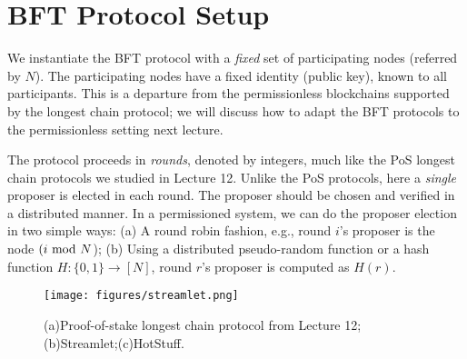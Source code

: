 \documentclass{article}
\newcommand{\pramod}[1]{{\color{red}
\footnotesize[Pramod: #1] }}
\begin{document}
\section*{BFT Protocol Setup}
We instantiate the  BFT protocol with a {\em fixed} set of participating nodes (referred by $N$). The participating nodes have a fixed identity (public key), known to all participants. This is a departure from the  permissionless blockchains supported by the longest chain protocol; we will discuss how to adapt the BFT protocols to the permissionless setting next lecture. 

The protocol proceeds in {\em rounds}, denoted by integers, much like the PoS longest chain protocols we studied in Lecture 12. Unlike the PoS protocols, here a {\em single} proposer is elected in each round.
The proposer should be chosen and verified in a distributed manner. In a permissioned system, we can do the proposer election in two simple ways: (a) A round robin fashion, e.g., round $i$'s proposer is the node $(i~ {\rm mod}~N$); (b) Using a distributed pseudo-random function or a hash function $H: \{0,1\} \rightarrow [N]$, round $r$’s proposer is computed as $H(r)$.


\begin{figure}
    \centering
    \texttt{[image: figures/streamlet.png]}
    \caption{(a)Proof-of-stake longest chain protocol from Lecture 12; (b)Streamlet;(c)HotStuff.}
    \label{fig:hotstuff}
\end{figure}

\end{document}

